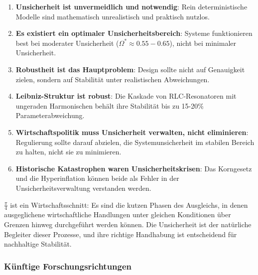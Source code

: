 \documentclass[a4paper, 12pt, twoside, openright]{report}
\theoremstyle{definition}
\theoremstyle{definition}
\begin{document}
\begin{enumerate}
    \item \textbf{Unsicherheit ist unvermeidlich und notwendig}: Rein deterministische Modelle sind mathematisch unrealistisch und praktisch nutzlos.
    
    \item \textbf{Es existiert ein optimaler Unsicherheitsbereich}: Systeme funktionieren best bei moderater Unsicherheit ($\Omega^* \approx 0.55-0.65$), nicht bei minimaler Unsicherheit.
    
    \item \textbf{Robustheit ist das Hauptproblem}: Design sollte nicht auf Genauigkeit zielen, sondern auf Stabilität unter realistischen Abweichungen.
    
    \item \textbf{Leibniz-Struktur ist robust}: Die Kaskade von RLC-Resonatoren mit ungeraden Harmonischen behält ihre Stabilität bis zu 15-20\% Parameterabweichung.
    
    \item \textbf{Wirtschaftspolitik muss Unsicherheit verwalten, nicht eliminieren}: Regulierung sollte darauf abzielen, die Systemunsicherheit im stabilen Bereich zu halten, nicht sie zu minimieren.
    
    \item \textbf{Historische Katastrophen waren Unsicherheitskrisen}: Das Korngesetz und die Hyperinflation können beide als Fehler in der Unsicherheitsverwaltung verstanden werden.
\end{enumerate}

$\frac{\pi}{4}$ ist ein Wirtschaftsschnitt: Es sind die kutzen Phasen des Ausgleichs, in denen ausgeglichene wirtschaftliche Handlungen unter gleichen Konditionen über Grenzen hinweg durchgeführt werden können. Die Unsicherheit ist der natürliche Begleiter dieser Prozesse, und ihre richtige Handhabung ist entscheidend für nachhaltige Stabilität.

\subsubsection{Künftige Forschungsrichtungen}
\end{document}
